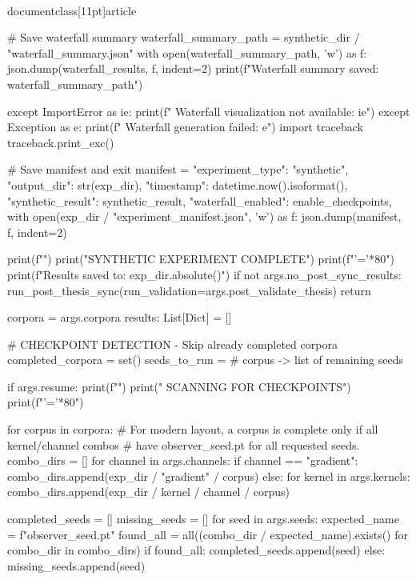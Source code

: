 \\documentclass[11pt]{article}
\begin{document}
\begin{CodeBlock}
                # Save waterfall summary
                waterfall_summary_path = synthetic_dir / "waterfall_summary.json"
                with open(waterfall_summary_path, 'w') as f:
                    json.dump(waterfall_results, f, indent=2)
                print(f"\n  Waterfall summary saved: {waterfall_summary_path}")

            except ImportError as ie:
                print(f"  Waterfall visualization not available: {ie}")
            except Exception as e:
                print(f"  Waterfall generation failed: {e}")
                import traceback
                traceback.print_exc()

        # Save manifest and exit
        manifest = {
            "experiment_type": "synthetic",
            "output_dir": str(exp_dir),
            "timestamp": datetime.now().isoformat(),
            "synthetic_result": synthetic_result,
            "waterfall_enabled": enable_checkpoints,
        }
        with open(exp_dir / "experiment_manifest.json", 'w') as f:
            json.dump(manifest, f, indent=2)

        print(f"")
        print("SYNTHETIC EXPERIMENT COMPLETE")
        print(f"{'='*80}")
        print(f"Results saved to: {exp_dir.absolute()}")
        if not args.no_post_sync_results:
            run_post_thesis_sync(run_validation=args.post_validate_thesis)
        return

    corpora = args.corpora
    results: List[Dict] = []
    
    #  CHECKPOINT DETECTION - Skip already completed corpora
    completed_corpora = set()
    seeds_to_run = {}  # corpus -> list of remaining seeds
    
    if args.resume:
        print(f"")
        print(" SCANNING FOR CHECKPOINTS")
        print(f"{'='*80}")
        
        for corpus in corpora:
            # For modern layout, a corpus is complete only if all kernel/channel combos
            # have observer_{seed}.pt for all requested seeds.
            combo_dirs = []
            for channel in args.channels:
                if channel == "gradient":
                    combo_dirs.append(exp_dir / "gradient" / corpus)
                else:
                    for kernel in args.kernels:
                        combo_dirs.append(exp_dir / kernel / channel / corpus)

            completed_seeds = []
            missing_seeds = []
            for seed in args.seeds:
                expected_name = f"observer_{seed}.pt"
                found_all = all((combo_dir / expected_name).exists() for combo_dir in combo_dirs)
                if found_all:
                    completed_seeds.append(seed)
                else:
                    missing_seeds.append(seed)
            

\end{CodeBlock}
\end{document}
